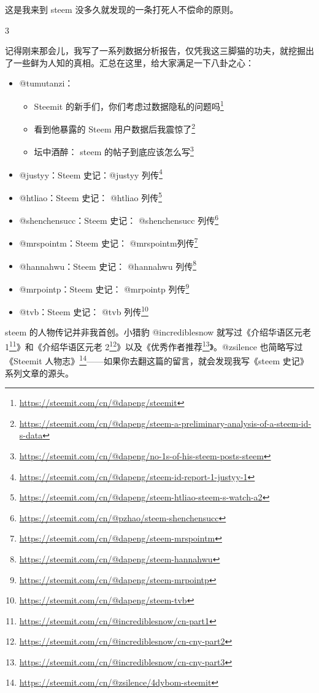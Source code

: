 \documentclass[]{ctexbook}
\providecommand{\tightlist}{%
  \setlength{\itemsep}{0pt}\setlength{\parskip}{0pt}}
\renewcommand{\href}[2]{#2\footnote{\url{#1}}}
\begin{document}
这是我来到 steem 没多久就发现的一条打死人不偿命的原则。

3

记得刚来那会儿，我写了一系列数据分析报告，仅凭我这三脚猫的功夫，就挖掘出了一些鲜为人知的真相。汇总在这里，给大家满足一下八卦之心：

\begin{itemize}
\tightlist
\item
  @tumutanzi：

  \begin{itemize}
  \tightlist
  \item
    \href{https://steemit.com/cn/@dapeng/steemit}{Steemit 的新手们，你们考虑过数据隐私的问题吗}
  \item
    \href{https://steemit.com/cn/@dapeng/steem-a-preliminary-analysis-of-a-steem-id-s-data}{看到他暴露的 Steem 用户数据后我震惊了}
  \item
    \href{https://steemit.com/cn/@dapeng/no-1s-of-his-steem-posts-steem}{坛中酒醉： steem 的帖子到底应该怎么写}
  \end{itemize}
\item
  @justyy：\href{https://steemit.com/cn/@dapeng/steem-id-report-1-justyy-1}{Steem 史记：@justyy 列传}
\item
  @htliao：\href{https://steemit.com/cn/@dapeng/steem-htliao-steem-s-watch-a2}{Steem 史记： @htliao 列传}
\item
  @shenchensucc：\href{https://steemit.com/cn/@pzhao/steem-shenchensucc}{Steem 史记： @shenchensucc 列传}
\item
  @mrspointm：\href{https://steemit.com/cn/@dapeng/steem-mrspointm}{Steem 史记： @mrspointm列传}
\item
  @hannahwu：\href{https://steemit.com/cn/@dapeng/steem-hannahwu}{Steem 史记： @hannahwu 列传}
\item
  @mrpointp：\href{https://steemit.com/cn/@dapeng/steem-mrpointp}{Steem 史记： @mrpointp 列传}
\item
  @tvb：\href{https://steemit.com/cn/@dapeng/steem-tvb}{Steem 史记： @tvb 列传}
\end{itemize}

steem 的人物传记并非我首创。小猎豹 @incrediblesnow 就写过《\href{https://steemit.com/cn/@incrediblesnow/cn-part1}{介绍华语区元老 1}》和《\href{https://steemit.com/cn/@incrediblesnow/cn-cny-part2}{介绍华语区元老 2}》以及《\href{https://steemit.com/cn/@incrediblesnow/cn-cny-part3}{优秀作者推荐}》。@zsilence 也简略写过《\href{https://steemit.com/cn/@zsilence/4dybom-steemit}{Steemit 人物志》}------如果你去翻这篇的留言，就会发现我写《steem 史记》系列文章的源头。
\end{document}
